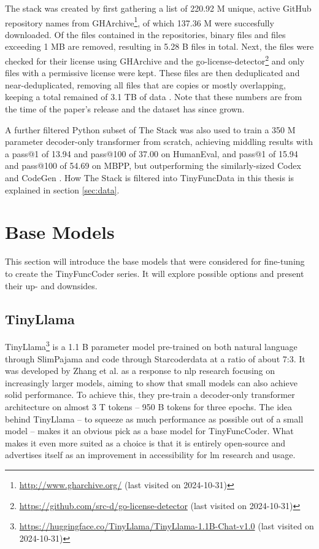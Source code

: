 The stack was created by first gathering a list of 220.92 M unique, active GitHub repository names from GHArchive\footnote{\url{http://www.gharchive.org/} (last visited on 2024-10-31)}, of which 137.36 M were succesfully downloaded.
Of the files contained in the repositories, binary files and files exceeding 1 MB are removed, resulting in 5.28 B files in total.
Next, the files were checked for their license using GHArchive and the go-license-detector\footnote{\url{https://github.com/src-d/go-license-detector} (last visited on 2024-10-31)} and only files with a permissive license were kept.
These files are then deduplicated \cite{He.2010} and near-deduplicated, removing all files that are copies or mostly overlapping, keeping a total remained of 3.1 TB of data \cite{Kocetkov.2023}.
Note that these numbers are from the time of the paper's release and the dataset has since grown.

A further filtered Python subset of The Stack was also used to train a 350 M parameter decoder-only transformer from scratch, achieving middling results with a pass@1 of 13.94 and pass@100 of 37.00 on HumanEval, and pass@1 of 15.94 and pass@100 of 54.69 on MBPP, but outperforming the similarly-sized Codex \cite{Chen.2021} and CodeGen \cite{Nijkamp.2022} \cite{Kocetkov.2023}.
How The Stack is filtered into TinyFuncData in this thesis is explained in section \ref{sec:data}.


\section{Base Models}
\label{sec:basemodels}

This section will introduce the base models that were considered for fine-tuning to create the TinyFuncCoder series.
It will explore possible options and present their up- and downsides.

\subsection{TinyLlama}
\label{sec:tinyllama}

TinyLlama\footnote{\url{https://huggingface.co/TinyLlama/TinyLlama-1.1B-Chat-v1.0} (last visited on 2024-10-31)} is a 1.1 B parameter model pre-trained on both natural language through SlimPajama \cite{Soboleva.2023} and code through Starcoderdata \cite{Li.2023b} at a ratio of about 7:3.
It was developed by Zhang et al. \cite{Zhang.2024} as a response to \ac{nlp} research focusing on increasingly larger models, aiming to show that small models can also achieve solid performance.
To achieve this, they pre-train a decoder-only transformer architecture on almost 3 T tokens -- 950 B tokens for three epochs.
The idea behind TinyLlama -- to squeeze as much performance as possible out of a small model -- makes it an obvious pick as a base model for TinyFuncCoder.
What makes it even more suited as a choice is that it is entirely open-source and advertises itself as an improvement in accessibility for \ac{lm} research and usage.

